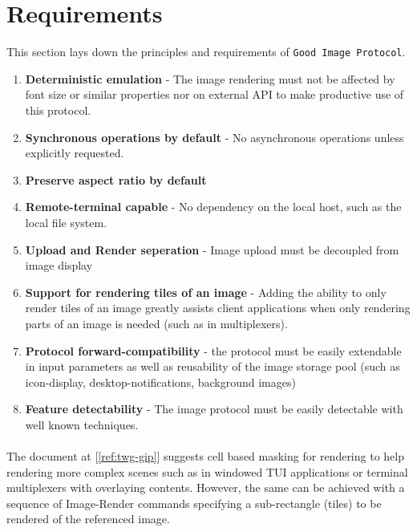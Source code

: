 \documentclass[a4paper]{article}
\newcommand{\code}[1]{\colorbox{light-gray}{\texttt{#1}}}
\newcommand{\GoodImageProtocol}{\code{Good Image Protocol}}
\begin{document}
\section{Requirements} %

This section lays down the principles and requirements of \GoodImageProtocol.

\begin{enumerate}
    \item \textbf{Deterministic emulation} - The image rendering must not be affected by font size
        or similar properties nor on external API to make productive use of this protocol.
    \item \textbf{Synchronous operations by default} - No asynchronous operations unless explicitly requested.
    \item \textbf{Preserve aspect ratio by default}
    \item \textbf{Remote-terminal capable} - No dependency on the local host, such as the local file system.
    \item \textbf{Upload and Render seperation} - Image upload must be decoupled from image display
    \item \textbf{Support for rendering tiles of an image} - Adding the ability to only render tiles
        of an image greatly assists client applications when only rendering parts of an image is
        needed (such as in multiplexers).
    \item \textbf{Protocol forward-compatibility} - the protocol must be easily extendable in input
        parameters as well as reusability of the image storage pool
        (such as icon-display, desktop-notifications, background images)
    \item \textbf{Feature detectability} - The image protocol must be easily detectable with well known techniques.
\end{enumerate}

\paragraph*{}

The document at [\ref{ref:twg-gip}] suggests cell based masking for rendering to help rendering more
complex scenes such as in windowed TUI applications or terminal multiplexers with overlaying contents.
However, the same can be achieved with a sequence of Image-Render commands specifying a
sub-rectangle (tiles) to be rendered of the referenced image.

\end{document}

